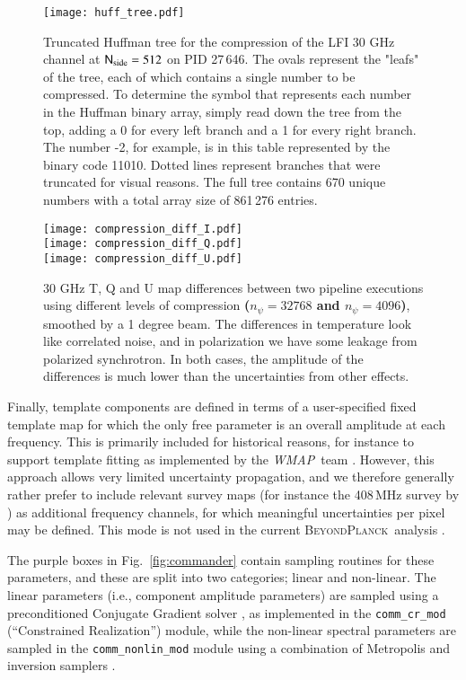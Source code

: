 \documentclass[twocolumn]{aa}
\def\WMAP{\emph{WMAP}}
\newcommand{\N}[0]{\tens{N}}
\newcommand{\BP}{\textsc{BeyondPlanck}}
\begin{document}
\begin{figure}[t]
  \center
  \texttt{[image: huff\_tree.pdf]}
  \caption{Truncated Huffman tree for the compression of the LFI 30 GHz channel at $\N_{\mathrm{side}}=512$ on PID 27\,646. The ovals represent the "leafs" of the tree, each of which contains a single number to be compressed. To determine the symbol that represents each number in the Huffman binary array, simply read down the tree from the top, adding a 0 for every left branch and a 1 for every right branch. The number -2, for example, is in this table represented by the binary code 11010. Dotted lines represent branches that were truncated for visual reasons. The full tree contains 670 unique numbers with a total array size of 861\,276 entries.
  }\label{fig:huffman}
\end{figure}

\begin{figure}[t]
  \center
  \texttt{[image: compression\_diff\_I.pdf]}\\
  \texttt{[image: compression\_diff\_Q.pdf]}\\
  \texttt{[image: compression\_diff\_U.pdf]}
  \caption{30 GHz T, Q and U map differences between two pipeline executions using different levels of compression \textbf{($n_{\psi}=32768$ and $n_{\psi}=4096$)}, smoothed by a 1 degree beam. The differences in temperature look like correlated noise, and in polarization we have some leakage from polarized synchrotron. In both cases, the amplitude of the differences is much lower than the uncertainties from other effects. 
  }\label{fig:compressiondiff}
\end{figure}

Finally, template components are defined in terms of a user-specified
fixed template map for which the only free parameter is an overall
amplitude at each frequency. This is primarily included for historical
reasons, for instance to support template fitting as implemented by
the \WMAP\ team \citep{bennett2012}. However, this approach allows
very limited uncertainty propagation, and we therefore generally
rather prefer to include relevant survey maps (for instance the
408\,MHz survey by \citealp{haslam1982}) as additional frequency
channels, for which meaningful uncertainties per pixel may be
defined. This mode is not used in the current \BP\ analysis
\citep{BP01}.

The purple boxes in Fig.~\ref{fig:commander} contain sampling routines
for these parameters, and these are split into two categories; linear
and non-linear. The linear parameters (i.e., component amplitude
parameters) are sampled using a preconditioned Conjugate Gradient
solver \citep{seljebotn:2019}, as implemented in the
\texttt{comm\_cr\_mod} (``Constrained Realization'') module, while the
non-linear spectral parameters are sampled in the
\texttt{comm\_nonlin\_mod} module using a combination of Metropolis
and inversion samplers \citep{BP13,BP14}.
\end{document}
